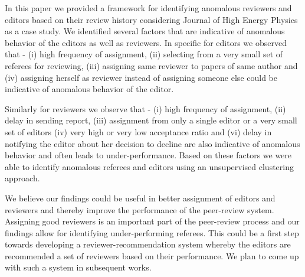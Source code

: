 \noindent

In this paper we provided a framework for identifying anomalous reviewers and editors based on  their review history considering Journal of High Energy Physics as a case study. We identified several factors that are indicative of anomalous behavior of the editors as well as reviewers. In specific for editors we observed that - 
(i) high frequency of assignment, (ii) selecting from a very small set of referees for reviewing, (iii) assigning same reviewer to papers of same author and (iv) assigning herself as reviewer instead of assigning someone else could be indicative of anomalous behavior of the editor. 

Similarly for reviewers we observe that - 
(i) high frequency of assignment, (ii) delay in sending report, (iii) assignment from only a single editor or a very small set of editors (iv) 
very high or very low acceptance ratio and (vi) delay in notifying the editor about her decision to decline are also indicative of anomalous behavior and often leads to under-performance. Based on these factors we were able to identify anomalous referees and editors using an unsupervised clustering approach. 

 We believe our findings could be useful in better assignment of editors and reviewers and thereby improve the performance of 
the peer-review system. Assigning good reviewers is an important part of the peer-review process and our findings allow for identifying under-performing referees. 
This could be a first step towards developing a reviewer-recommendation system whereby the editors are recommended a set of reviewers based on their performance. 
We plan to come up with such a system in subsequent works.

